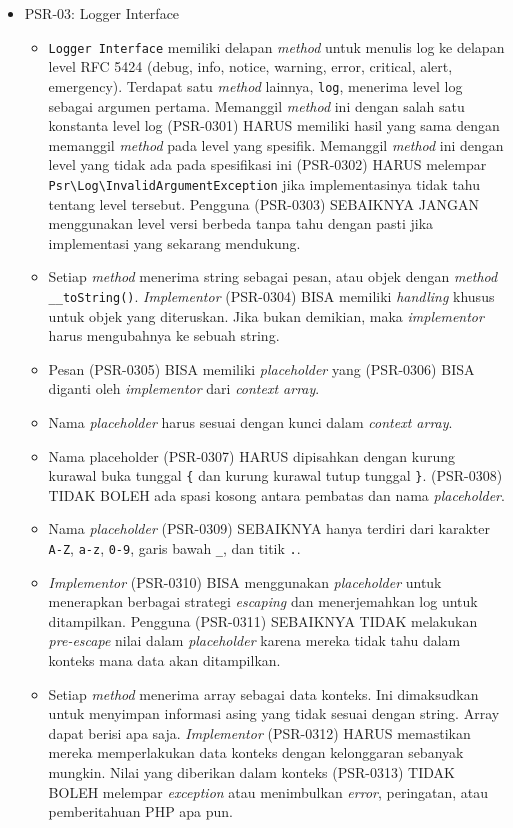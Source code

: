 \documentclass[a4paper,twoside]{article}
\begin{document}
\begin{enumerate}
\begin{enumerate}
\begin{itemize}
				\item PSR-03: Logger Interface
				\begin{itemize}
					\item \verb|Logger Interface| memiliki delapan \textit{method} untuk menulis log ke delapan level RFC 5424 (debug, info, notice, warning, error, critical, alert, emergency). Terdapat satu \textit{method} lainnya, \verb|log|, menerima level log sebagai argumen pertama. Memanggil \textit{method} ini dengan salah satu konstanta level log (PSR-0301) HARUS memiliki hasil yang sama dengan memanggil \textit{method} pada level yang spesifik. Memanggil \textit{method} ini dengan level yang tidak ada pada spesifikasi ini (PSR-0302) HARUS melempar \verb|Psr\Log\InvalidArgumentException| jika implementasinya tidak tahu tentang level tersebut. Pengguna (PSR-0303) SEBAIKNYA JANGAN menggunakan level versi berbeda tanpa tahu dengan pasti jika implementasi yang sekarang mendukung. 
					\item Setiap \textit{method} menerima string sebagai pesan, atau objek dengan \textit{method} \verb|__toString()|. \textit{Implementor} (PSR-0304) BISA memiliki \textit{handling} khusus untuk objek yang diteruskan. Jika bukan demikian, maka \textit{implementor} harus mengubahnya ke sebuah string.
					\item Pesan (PSR-0305) BISA memiliki \textit{placeholder} yang (PSR-0306) BISA diganti oleh \textit{implementor} dari \textit{context array}.
					\item Nama \textit{placeholder} harus sesuai dengan kunci dalam \textit{context array}.
					\item Nama placeholder (PSR-0307) HARUS dipisahkan dengan kurung kurawal buka tunggal \verb|{| dan kurung kurawal tutup tunggal \verb|}|. (PSR-0308) TIDAK BOLEH ada spasi kosong antara pembatas dan nama \textit{placeholder}.
					\item Nama \textit{placeholder} (PSR-0309) SEBAIKNYA hanya terdiri dari karakter \verb|A-Z|, \verb|a-z|, \verb|0-9|, garis bawah \verb|_|, dan titik \verb|.|.
					\item \textit{Implementor} (PSR-0310) BISA menggunakan \textit{placeholder} untuk menerapkan berbagai strategi \textit{escaping} dan menerjemahkan log untuk ditampilkan. Pengguna (PSR-0311) SEBAIKNYA TIDAK melakukan \textit{pre-escape} nilai dalam \textit{placeholder} karena mereka tidak tahu dalam konteks mana data akan ditampilkan. 
					\item Setiap \textit{method} menerima array sebagai data konteks. Ini dimaksudkan untuk menyimpan informasi asing yang tidak sesuai dengan string. Array dapat berisi apa saja. \textit{Implementor} (PSR-0312) HARUS memastikan mereka memperlakukan data konteks dengan kelonggaran sebanyak mungkin. Nilai yang diberikan dalam konteks (PSR-0313) TIDAK BOLEH melempar \textit{exception} atau menimbulkan \textit{error}, peringatan, atau pemberitahuan PHP apa pun.

\end{itemize}
\end{itemize}
\end{enumerate}
\end{enumerate}
\end{document}
